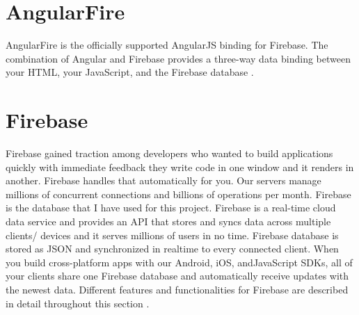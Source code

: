 \section{AngularFire}
AngularFire is the officially supported AngularJS binding for Firebase. The combination of Angular and Firebase provides a three-way data binding between your HTML, your JavaScript, and the Firebase database \cite{Firebase}.

\section{Firebase}
Firebase gained traction among developers who wanted to build applications quickly with immediate feedback they write code in one window and it renders in another. Firebase handles that automatically for you. Our servers manage millions of concurrent connections and billions of operations per month.
Firebase is the database that I have used for this project. Firebase is a real-time cloud data service and provides an API that stores and syncs data across multiple clients/ devices and it serves millions of users in no time. Firebase database is stored as JSON and synchronized in realtime to every connected client. When you build cross-platform apps with our Android, iOS, andJavaScript SDKs, all of your clients share one Firebase database and automatically receive updates with the newest data.
Different features and functionalities for Firebase are described in detail throughout this section \cite{Firebase}.

